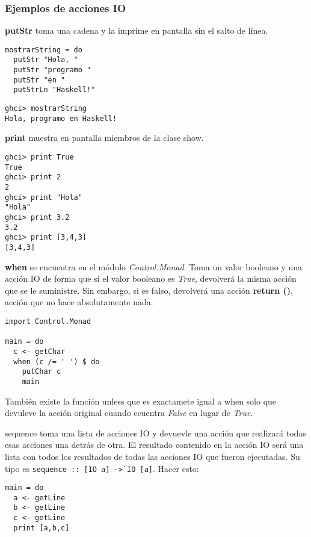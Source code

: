 \subsubsection{Ejemplos de acciones IO} %
\label{ssub:ejemplos_de_acciones_io}

\textbf{putStr} toma una cadena y la imprime en pantalla sin el salto de línea.

\begin{lstlisting}
mostrarString = do
  putStr "Hola, "
  putStr "programo "
  putStr "en "
  putStrLn "Haskell!"
\end{lstlisting}

\begin{lstlisting}
ghci> mostrarString
Hola, programo en Haskell!
\end{lstlisting}

\textbf{print} muestra en pantalla miembros de la clase show.

\begin{lstlisting}
ghci> print True
True
ghci> print 2
2
ghci> print "Hola"
"Hola"
ghci> print 3.2
3.2
ghci> print [3,4,3]
[3,4,3]
\end{lstlisting}

\textbf{when} se encuentra en el módulo \textit{Control.Monad}.
Toma un valor booleano y una acción IO de forma que si el valor booleano es \textit{True}, devolverá
la misma acción que se le suministre. Sin embargo, si es falso, devolverá una acción \textbf{return ()}, acción que no hace absolutamente nada.

\begin{lstlisting}
import Control.Monad

main = do
  c <- getChar
  when (c /= ' ') $ do
    putChar c
    main
\end{lstlisting}

También existe la función unless que es exactamete igual a when solo que devuleve la acción original cuando ecuentra \textit{False} en lugar de \textit{True}.

sequence toma una lista de acciones IO y devuevle una acción que realizará todas esas acciones una detrás de otra. El resultado contenido en la acción IO será una lista con todos los resultados de todas las acciones IO que fueron ejecutadas. Su tipo es \lstinline$sequence :: [IO a] ->`IO [a]$. Hacer esto:

\begin{lstlisting}
main = do
  a <- getLine
  b <- getLine
  c <- getLine
  print [a,b,c]
\end{lstlisting}

